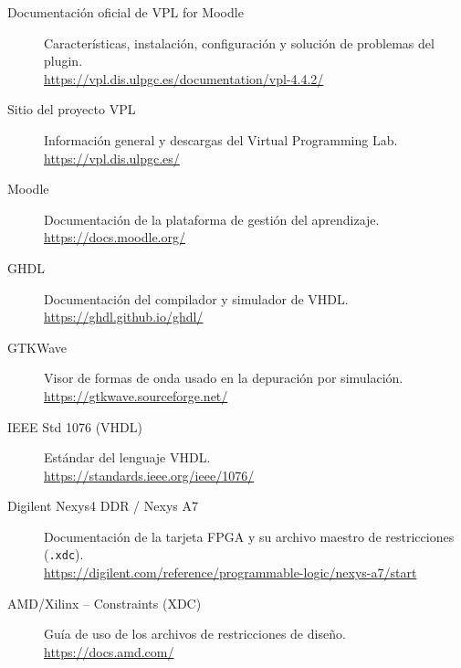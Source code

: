 \documentclass[12pt, a4paper, twoside, openany]{book}
\newcommand{\vhdl}{\textsc{VHDL}\xspace}
\begin{document}
\begin{description}
  \item[Documentación oficial de VPL for Moodle] Características, instalación,
        configuración y solución de problemas del plugin. \\
        \url{https://vpl.dis.ulpgc.es/documentation/vpl-4.4.2/}
  \item[Sitio del proyecto VPL] Información general y descargas del Virtual
        Programming Lab. \\
        \url{https://vpl.dis.ulpgc.es/}
  \item[Moodle] Documentación de la plataforma de gestión del aprendizaje. \\
        \url{https://docs.moodle.org/}
  \item[GHDL] Documentación del compilador y simulador de \vhdl. \\
        \url{https://ghdl.github.io/ghdl/}
  \item[GTKWave] Visor de formas de onda usado en la depuración por
        simulación. \\
        \url{https://gtkwave.sourceforge.net/}
  \item[IEEE Std 1076 (VHDL)] Estándar del lenguaje \vhdl. \\
        \url{https://standards.ieee.org/ieee/1076/}
  \item[Digilent Nexys4 DDR / Nexys A7] Documentación de la tarjeta FPGA y su
        archivo maestro de restricciones (\texttt{.xdc}). \\
        \url{https://digilent.com/reference/programmable-logic/nexys-a7/start}
  \item[AMD/Xilinx – Constraints (XDC)] Guía de uso de los archivos de
        restricciones de diseño. \\
        \url{https://docs.amd.com/}
\end{description}

\backmatter

% 
\end{document}
